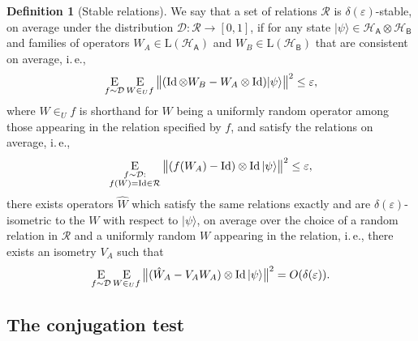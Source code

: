 \documentclass[11pt]{article}
\numberwithin{equation}{section}
\theoremstyle{definition}
\newtheorem{definition}[theorem]{Definition}
\theoremstyle{plain}
\newcommand{\ie}{i.\,e.}
\newcommand{\ket}[1]{|#1\rangle}
\newcommand{\Id}{\ensuremath{\mathop{\rm Id}\nolimits}}
\newcommand{\Es}[1]{\ensuremath{\mathop{\textsc{E}}}_{#1}} %
\newcommand{\setft}[1]{\mathrm{#1}}
\newcommand{\Lin}{\setft{L}}
\newcommand{\reg}[1]{{\textsf{#1}}}
\newcommand{\mH}{\mathcal{H}}
\newcommand{\eps}{\varepsilon}
\begin{document}
\begin{definition}[Stable relations]
We say that a set of relations $\mathcal{R}$ is $\delta(\eps)$-stable, on average under the distribution $\mathcal{D}:\mathcal{R}\to[0,1]$, if for any state $\ket{\psi}\in\mH_\reg{A}\otimes \mH_\reg{B}$ and families of operators $W_A\in\Lin(\mH_\reg{A})$ and  $W_B\in\Lin(\mH_\reg{B})$ that are consistent on average, \ie, 
$$\Es{f \sim\mathcal{D}} \Es{W \in_U f} \big\| (\Id\otimes W_B - W_A \otimes \Id)\ket{\psi}\big\|^2\leq \eps,$$
where $W \in_U f$ is shorthand for $W$ being a uniformly random operator among those appearing in the relation specified by $f$,
and satisfy the relations on average, \ie, 
$$\Es{\substack{f\sim\mathcal{D}:\\f(W)=\Id \in\mathcal{R}}} \big\|  (f(W_A)- \Id) \otimes \Id \ket{\psi}\big\|^2 \leq \eps,$$
  there exists operators $\hat{W}$ which satisfy the same relations exactly and are $\delta(\eps)$-isometric to the $W$ with respect to $\ket{\psi}$, on average over the choice of a random relation in $\mathcal{R}$ and a uniformly random $W$ appearing in the relation, \ie, there exists an isometry $V_A$ such that 
  \begin{equation}
    \Es{f \sim\mathcal{D}} \Es{W \in_U f} \big\|( \hat{W}_A-V_A W_A)\otimes \Id \ket{\psi}\big\|^2=O(\delta(\eps)).\nonumber
  \end{equation}
	\end{definition}


\subsection{The conjugation test}
\label{sec:conj-test}
\end{document}
